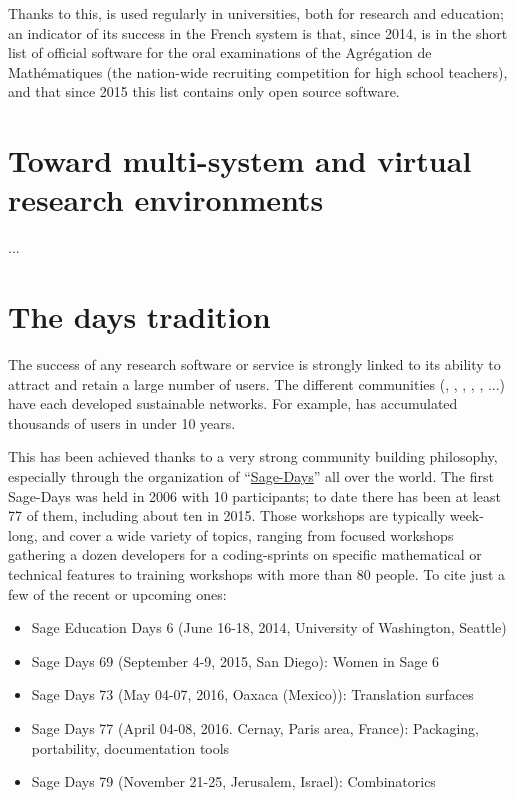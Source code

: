\documentclass[12pt]{amsbook}
\begin{document}
Thanks to this, \Sage is used regularly in universities, both for
research and education; an indicator of its success in the French
system is that, since 2014, \Sage is in the short list of official
software for the oral examinations of the Agrégation de Mathématiques
(the nation-wide recruiting competition for high school teachers), and
that since 2015 this list contains only open source software.

\section{Toward multi-system and virtual research environments}

...

\section{The \Sage days tradition}

The success of any research software or service is strongly linked to
its ability to attract and retain a large number of users. The
different communities (\Sage, \GAP, \Pari, \Singular, \Jupyter, ...)
have each developed sustainable networks. For example, \Sage has
accumulated thousands of users in under 10 years.

This has been achieved thanks to a very strong community building
philosophy, especially through the organization of
“\href{https://wiki.sagemath.org/Workshops}{Sage-Days}” all over the
world. The first Sage-Days was held in 2006 with 10 participants; to
date there has been at least 77 of them, including about ten in
2015. Those workshops are typically week-long, and cover a wide
variety of topics, ranging from focused workshops gathering a dozen
developers for a coding-sprints on specific mathematical or technical
features to training workshops with more than 80 people. To cite just
a few of the recent or upcoming ones:

\begin{itemize}
\item Sage Education Days 6 (June 16-18, 2014, University of
  Washington, Seattle)
\item Sage Days 69 (September 4-9, 2015, San Diego): Women in Sage 6
\item Sage Days 73 (May 04-07, 2016, Oaxaca (Mexico)): Translation surfaces
\item Sage Days 77 (April 04-08, 2016. Cernay, Paris area, France):
  Packaging, portability, documentation tools
\item Sage Days 79 (November 21-25, Jerusalem, Israel): Combinatorics
\end{itemize}
\end{document}
